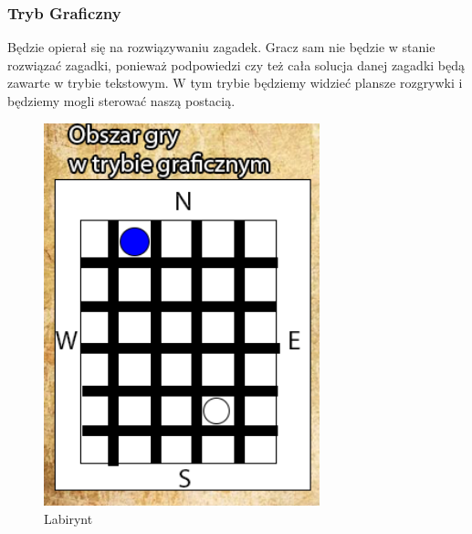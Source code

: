 \subsubsection{Tryb Graficzny}
Będzie opierał się na rozwiązywaniu zagadek. Gracz sam nie będzie w stanie rozwiązać zagadki, ponieważ podpowiedzi czy też cała solucja danej zagadki będą zawarte w trybie tekstowym.
W tym trybie będziemy widzieć plansze rozgrywki i będziemy mogli sterować naszą postacią.
\\
	\begin{figure}[!htb]
	\begin{center}
		\includegraphics[width=8cm]{rys/gra2.png}
		\caption{Labirynt}
		\label{rys:rysunek001}
	\end{center}
\end{figure}

